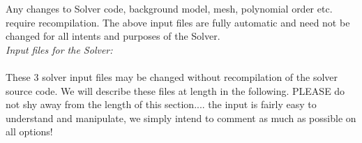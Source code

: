 \documentclass[11pt,letter,fleqn,english,notitlepage]{article}
\begin{document}
\noindent Any changes to Solver code, background model, mesh, polynomial order etc. require 
recompilation. The above input files are fully automatic and need not be changed for all intents 
and purposes of the Solver.\\

\noindent \textit{Input files for the Solver:} \\
\\
These 3 solver input files may be changed without recompilation of the solver 
source code. We will describe these files at length in the following. PLEASE do not shy away from the 
length of this section.... the input is fairly easy to understand and manipulate, 
we simply intend to comment as much as possible on all options!\\
\end{document}
